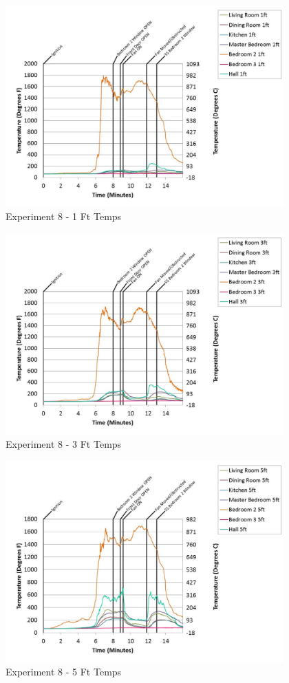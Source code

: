 \documentclass{article}
\begin{document}
\begin{appendices}
	\begin{figure}[h!]
		\centering
		\includegraphics[height=3.05in]{0_Images/Results_Charts/Exp_8_Charts/1FtTemps.pdf}
		\caption{Experiment 8 - 1 Ft Temps}
	\end{figure}
 

	\begin{figure}[h!]
		\centering
		\includegraphics[height=3.05in]{0_Images/Results_Charts/Exp_8_Charts/3FtTemps.pdf}
		\caption{Experiment 8 - 3 Ft Temps}
	\end{figure}
 
	\clearpage

	\begin{figure}[h!]
		\centering
		\includegraphics[height=3.05in]{0_Images/Results_Charts/Exp_8_Charts/5FtTemps.pdf}
		\caption{Experiment 8 - 5 Ft Temps}
	\end{figure}
 


\end{appendices}
\end{document}
